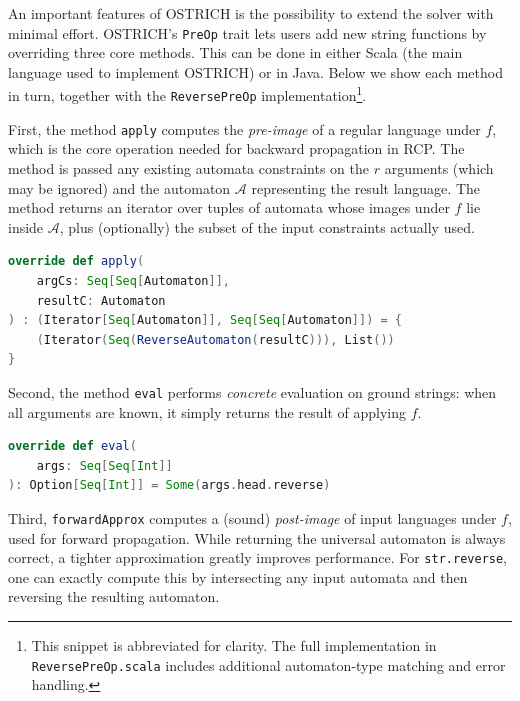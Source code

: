 
An important features of OSTRICH is the possibility to extend the
solver with minimal effort.
%
OSTRICH’s \texttt{PreOp} trait lets users add new string functions by
overriding three core methods. This can be done in either Scala (the
main language used to implement OSTRICH) or in Java.
%
Below we show each method in turn,
together with the \texttt{ReversePreOp} implementation\footnote{This
  snippet is abbreviated for clarity. The full implementation in
  \texttt{ReversePreOp.scala} includes additional automaton‐type
  matching and error handling.}.

First, the method \texttt{apply} computes the \emph{pre-image} of a
regular language under $f$, which is the core operation needed for
backward propagation in RCP.  The method is passed any existing automata constraints on the $r$ arguments (which may be ignored) and the automaton $\mathcal{A}$ representing the result language.  The method returns an iterator over tuples of automata whose images under $f$ lie inside $\mathcal{A}$, plus (optionally) the subset of the input constraints actually used.

\begin{lstlisting}[language=Scala]
override def apply(
	argCs: Seq[Seq[Automaton]],
	resultC: Automaton
) : (Iterator[Seq[Automaton]], Seq[Seq[Automaton]]) = {
	(Iterator(Seq(ReverseAutomaton(resultC))), List())
}
\end{lstlisting}

Second, the method \texttt{eval} performs \emph{concrete} evaluation on ground strings: when all arguments are known, it simply returns the result of applying $f$.

\begin{lstlisting}[language=Scala]
override def eval(
	args: Seq[Seq[Int]]
): Option[Seq[Int]] = Some(args.head.reverse)
\end{lstlisting}

Third, \texttt{forwardApprox} computes a (sound) \emph{post-image} of input languages under $f$, used for forward propagation.  While returning the universal automaton is always correct, a tighter approximation greatly improves performance.  For \texttt{str.reverse}, one can exactly compute this by intersecting any input automata and then reversing the resulting automaton.

